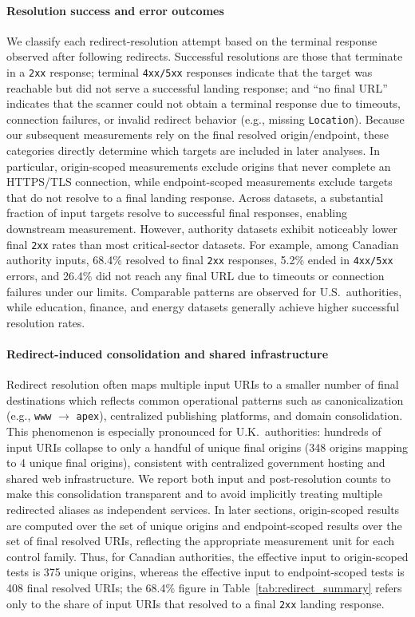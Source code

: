 \documentclass[a4paper,fleqn]{cas-sc}
\begin{document}
    \paragraph{Resolution success and error outcomes}
    We classify each redirect-resolution attempt based on the terminal response observed after following redirects. 
    Successful resolutions are those that terminate in a \texttt{2xx} response; terminal \texttt{4xx/5xx} responses indicate that the target was reachable but did not serve a successful landing response; and ``no final URL'' indicates that the scanner could not obtain a terminal response due to timeouts, connection failures, or invalid redirect behavior (e.g., missing \texttt{Location}). 
    Because our subsequent measurements rely on the final resolved origin/endpoint, these categories directly determine which targets are included in later analyses. 
    In particular, origin-scoped measurements exclude origins that never complete an HTTPS/TLS connection, while endpoint-scoped measurements exclude targets that do not resolve to a final landing response.
% 
    Across datasets, a substantial fraction of input targets resolve to successful final responses, enabling downstream measurement. However, authority datasets exhibit noticeably lower final \texttt{2xx} rates than most critical-sector datasets. For example, among Canadian authority inputs, 68.4\% resolved to final \texttt{2xx} responses, 5.2\% ended in \texttt{4xx/5xx} errors, and 26.4\% did not reach any final URL due to timeouts or connection failures under our limits. 
    Comparable patterns are observed for U.S.\ authorities, while education, finance, and energy datasets generally achieve higher successful resolution rates. 

    \paragraph{Redirect-induced consolidation and shared infrastructure}
    Redirect resolution often maps multiple input URIs to a smaller number of final destinations which reflects common operational patterns such as canonicalization (e.g., \texttt{www} $\rightarrow$ \texttt{apex}), centralized publishing platforms, and domain consolidation.
    This phenomenon is especially pronounced for U.K.\ authorities: hundreds of input URIs collapse to only a handful of unique final origins (348 origins mapping to 4 unique final origins), consistent with centralized government hosting and shared web infrastructure. 
    We report both input and post-resolution counts to make this consolidation transparent and to avoid implicitly treating multiple redirected aliases as independent services. 
    In later sections, origin-scoped results are computed over the set of unique origins and endpoint-scoped results over the set of final resolved URIs, reflecting the appropriate measurement unit for each control family. Thus, for Canadian authorities, the effective input to origin-scoped tests is 375 unique origins, whereas the effective input to endpoint-scoped tests is 408 final resolved URIs; the 68.4\% figure in Table~\ref{tab:redirect_summary} refers only to the share of input URIs that resolved to a final \texttt{2xx} landing response.
    
\end{document}
